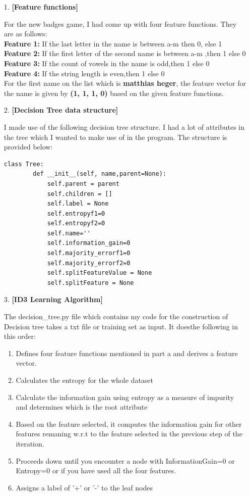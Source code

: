 \documentclass[11pt]{article}
\begin{document}
\begin{enumerate}

\item[1.] \textbf{[Feature functions]}	

For the new badges game, I had come up with four feature functions. They are as follows: \\

\textbf{Feature 1:} If the last letter in the name is between a-m then 0, else 1 \\
\textbf{Feature 2:} If the first letter of the second name is between a-m ,then 1 else 0 \\
\textbf{Feature 3:} If the count of vowels in the name is odd,then 1 else 0 \\
\textbf{Feature 4:} If the string length is even,then 1 else 0 \\ 

For the first name on the list which  is \textbf{ matthias heger}, the feature vector for the name is given by \textbf{(1, 1, 1, 0)}
based on the given feature functions.

\item[2.] \textbf{[Decision Tree data structure]}	

I made use of the following decision tree structure. I had a lot of attributes in the tree which I wanted to make use of in the program. The structure is provided below:

\begin{verbatim}
class Tree:
		def __init__(self, name,parent=None):
			self.parent = parent
			self.children = []
			self.label = None
			self.entropyf1=0
			self.entropyf2=0
			self.name=''
			self.information_gain=0
			self.majority_errorf1=0
			self.majority_errorf2=0
			self.splitFeatureValue = None
			self.splitFeature = None
\end{verbatim}

\item[3.] \textbf{[ID3 Learning Algorithm]}

The decision\_tree.py file which contains my code for the construction of Decision tree takes a txt file or training set as input. It doesthe following in this order:

\begin{enumerate}

\item Defines four feature functions mentioned in part a and derives a feature vector.
\item Calculates the entropy  for the whole dataset
\item Calculate the information gain using entropy as a measure of impurity and determines which is the root attribute
\item Based on the feature selected, it computes the information gain for other features remaning w.r.t to  the feature selected in the previous step of the iteration.
\item Proceeds down until you encounter a node with InformationGain=0 or Entropy=0 or if you have used all the four features.
\item Assigns a label of '+' or '-' to the leaf nodes	


\end{enumerate}
\end{enumerate}
\end{document}
